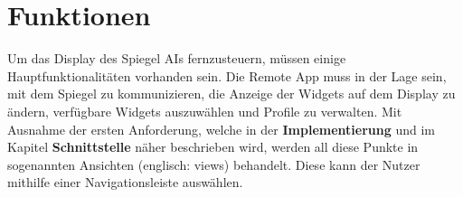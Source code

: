 \section{Funktionen}
Um das Display des Spiegel AIs fernzusteuern, müssen einige Hauptfunktionalitäten vorhanden sein. Die Remote App muss in der Lage sein, mit dem Spiegel zu kommunizieren, die Anzeige der Widgets auf dem Display zu ändern, verfügbare Widgets auszuwählen und Profile zu verwalten. Mit Ausnahme der ersten Anforderung, welche in der \textbf{Implementierung} und im Kapitel \textbf{Schnittstelle} näher beschrieben wird, werden all diese Punkte in sogenannten Ansichten (englisch: views) behandelt. Diese kann der Nutzer mithilfe einer Navigationsleiste auswählen.
\begin{figure}[h]
    \centering
    \begin{minipage}[b]{0.27\textwidth}
        \centering

\end{minipage}
\end{figure}
